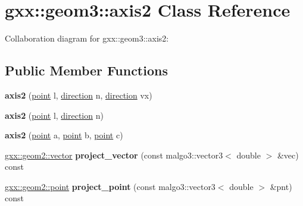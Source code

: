 \hypertarget{classgxx_1_1geom3_1_1axis2}{}\section{gxx\+:\+:geom3\+:\+:axis2 Class Reference}
\label{classgxx_1_1geom3_1_1axis2}


Collaboration diagram for gxx\+:\+:geom3\+:\+:axis2\+:
\subsection*{Public Member Functions}
\begin{DoxyCompactItemize}
\item 
{\bfseries axis2} (\hyperlink{classgxx_1_1geom3_1_1point}{point} l, \hyperlink{classgxx_1_1geom3_1_1direction}{direction} n, \hyperlink{classgxx_1_1geom3_1_1direction}{direction} vx)\hypertarget{classgxx_1_1geom3_1_1axis2_a807a7398df31fbcba7fec71b2c89d8c8}{}\label{classgxx_1_1geom3_1_1axis2_a807a7398df31fbcba7fec71b2c89d8c8}

\item 
{\bfseries axis2} (\hyperlink{classgxx_1_1geom3_1_1point}{point} l, \hyperlink{classgxx_1_1geom3_1_1direction}{direction} n)\hypertarget{classgxx_1_1geom3_1_1axis2_a6e3462034e771e2719acc408e6df9ec0}{}\label{classgxx_1_1geom3_1_1axis2_a6e3462034e771e2719acc408e6df9ec0}

\item 
{\bfseries axis2} (\hyperlink{classgxx_1_1geom3_1_1point}{point} a, \hyperlink{classgxx_1_1geom3_1_1point}{point} b, \hyperlink{classgxx_1_1geom3_1_1point}{point} c)\hypertarget{classgxx_1_1geom3_1_1axis2_a3ee7933a05115475fd63bd4c829cbc81}{}\label{classgxx_1_1geom3_1_1axis2_a3ee7933a05115475fd63bd4c829cbc81}

\item 
\hyperlink{classmalgo_1_1vector2}{gxx\+::geom2\+::vector} {\bfseries project\+\_\+vector} (const malgo3\+::vector3$<$ double $>$ \&vec) const \hypertarget{classgxx_1_1geom3_1_1axis2_a7d2f121065e1677e603b2eb0da53124b}{}\label{classgxx_1_1geom3_1_1axis2_a7d2f121065e1677e603b2eb0da53124b}

\item 
\hyperlink{classmalgo_1_1vector2}{gxx\+::geom2\+::point} {\bfseries project\+\_\+point} (const malgo3\+::vector3$<$ double $>$ \&pnt) const \hypertarget{classgxx_1_1geom3_1_1axis2_a33e08456b3b043500219a016df956db7}{}\label{classgxx_1_1geom3_1_1axis2_a33e08456b3b043500219a016df956db7}


\end{DoxyCompactItemize}
